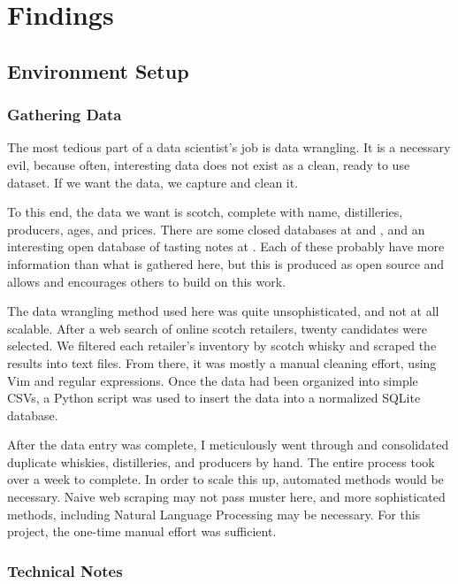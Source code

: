 \chapter{Findings}

\section{Environment Setup}

\subsection{Gathering Data}

The most tedious part of a data scientist's job is data wrangling. It is a necessary evil, because often, interesting data does not exist as a clean, ready to use dataset. If we want the data, we capture and clean it.

To this end, the data we want is scotch, complete with name, distilleries, producers, ages, and prices.  There are some closed databases at \cite{WhiskyDotCom} and \cite{WhiskyStats}, and an interesting open database of tasting notes at \cite{WhiskyAnalysis}. Each of these probably have more information than what is gathered here, but this is produced as open source and allows and encourages others to build on this work.

The data wrangling method used here was quite unsophisticated, and not at all scalable. After a web search of online scotch retailers, twenty candidates were selected. We filtered each retailer's inventory by scotch whisky and scraped the results into text files. From there, it was mostly a manual cleaning effort, using Vim and regular expressions. Once the data had been organized into simple CSVs, a Python script was used to insert the data into a normalized SQLite database. 

After the data entry was complete, I meticulously went through and consolidated duplicate whiskies, distilleries, and producers by hand. The entire process took over a week to complete. In order to scale this up, automated methods would be necessary. Naive web scraping may not pass muster here, and more sophisticated methods, including Natural Language Processing may be necessary. For this project, the one-time manual effort was sufficient.

\subsection{Technical Notes}


